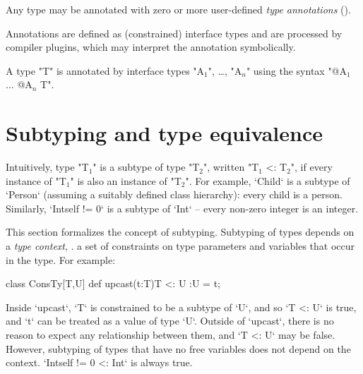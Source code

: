         Any \Xten{} type may be annotated with zero or more
        user-defined \emph{type annotations}
        ().  

        Annotations are defined as (constrained) interface types and are
        processed by compiler plugins, which may interpret the
        annotation symbolically.

        A type \xcd"T" is annotated by interface types
        \xcdmath"A$_1$", \dots,
        \xcdmath"A$_n$"
        using the syntax
        \xcdmath"@A$_1$ $\dots$ @A$_n$ T".

\section{Subtyping and type equivalence}\label{DepType:Equivalence}

Intuitively, type \xcdmath"T$_1$" is a subtype of type \xcdmath"T$_2$", 
written \xcdmath"T$_1$ <: T$_2$", 
if
every instance of \xcdmath"T$_1$" is also an instance of \xcdmath"T$_2$".  For
example, \xcd`Child` is a subtype of \xcd`Person` (assuming a suitably defined
class hierarchy): every child is a person.  Similarly, \xcd`Int{self != 0}`
is a subtype of \xcd`Int` -- every non-zero integer is an integer.  

This section formalizes the concept of subtyping. Subtyping of types depends
on a {\em type context}, \viz. a set of constraints on type parameters
and variables that occur in the type.
For example: 

\begin{xten}
class ConsTy[T,U] {
   def upcast(t:T){T <: U} :U = t;
}
\end{xten}
%
\noindent
Inside \xcd`upcast`, \xcd`T` is constrained to be a subtype of \xcd`U`, and so
\xcd`T <: U` is true, and \xcd`t` can be treated as a value of type \xcd`U`.  
Outside of \xcd`upcast`, there is no reason to expect any relationship between
them, and \xcd`T <: U` may be false.
However, subtyping of types that have no free variables does not depend
on the context.    \xcd`Int{self != 0} <: Int` is always
true.



